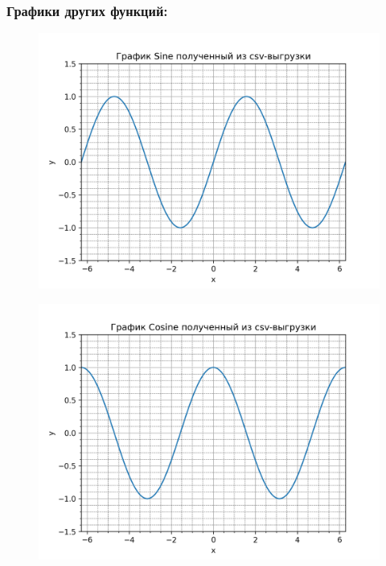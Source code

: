 \documentclass[12pt,onecolumn]{article}
\begin{document}
\subsubsection*{Графики других функций:}
\begin{figure}[H]
    \centering
    \includegraphics[width=\textwidth]{image/Sine.png}
\end{figure}
\begin{figure}[H]
    \centering
    \includegraphics[width=\textwidth]{image/Cosine.png}
\end{figure}
\end{document}
